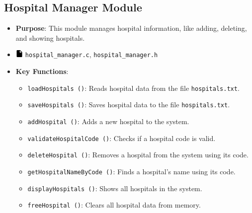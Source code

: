 \documentclass[12pt,a4paper]{report}
\begin{document}
\subsection{Hospital Manager Module}
\begin{itemize}
    \item \normalsize \textbf{Purpose}: This module manages hospital information, like adding, deleting, and showing hospitals.
    \item \normalsize \includegraphics[width=0.03\textwidth]{../resources/assets/images/file_icon.png} \texttt{hospital\_manager.c}, \texttt{hospital\_manager.h}
    \item \normalsize \textbf{Key Functions}:
    \begin{itemize}
        \item \texttt{loadHospitals ()}: Reads hospital data from the file \texttt{hospitals.txt}.
        \item \texttt{saveHospitals ()}: Saves hospital data to the file \texttt{hospitals.txt}.
        \item \texttt{addHospital ()}: Adds a new hospital to the system.
        \item \texttt{validateHospitalCode ()}: Checks if a hospital code is valid.
        \item \texttt{deleteHospital ()}: Removes a hospital from the system using its code.
        \item \texttt{getHospitalNameByCode ()}: Finds a hospital's name using its code.
        \item \texttt{displayHospitals ()}: Shows all hospitals in the system.
        \item \texttt{freeHospital ()}: Clears all hospital data from memory.
    \end{itemize}
\end{itemize}
\end{document}
